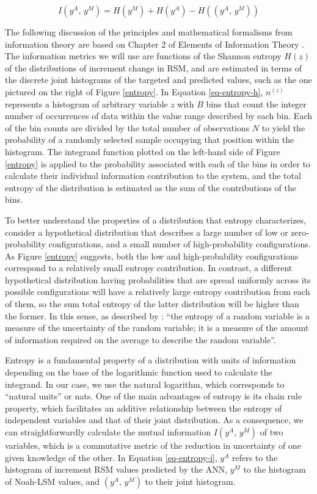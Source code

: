 \begin{equation}\label{eq-entropy-i}
    I(y^A,\,y^M) = H(y^M) + H(y^A) - H((y^A,\,y^M)) %
\end{equation}

The following discussion of the principles and mathematical formalisms from information theory are based on Chapter 2 of Elements of Information Theory \citep{schilling_entropy_2005}. The information metrics we will use are functions of the Shannon entropy $H(z)$ of the distributions of increment change in RSM, and are estimated in terms of the discrete joint histograms of the targeted and predicted values, such as the one pictured on the right of Figure \ref{entropy}. In Equation \ref{eq-entropy-h}, $n^{(z)}$ represents a histogram of arbitrary variable $z$ with $B$ bins that count the integer number of occurrences of data within the value range described by each bin. Each of the bin counts are divided by the total number of observations $N$ to yield the probability of a randomly selected sample occupying that position within the histogram. The integrand function plotted on the left-hand side of Figure \ref{entropy} is applied to the probability associated with each of the bins in order to calculate their individual information contribution to the system, and the total entropy of the distribution is estimated as the sum of the contributions of the bins.

To better understand the properties of a distribution that entropy characterizes, consider a hypothetical distribution that describes a large number of low or zero-probability configurations, and a small number of high-probability configurations. As Figure \ref{entropy} suggests, both the low and high-probability configurations correspond to a relatively small entropy contribution. In contrast, a different hypothetical distribution having probabilities that are spread uniformly across its possible configurations will have a relatively large entropy contribution from each of them, so the sum total entropy of the latter distribution will be higher than the former. In this sense, as described by \citep{schilling_entropy_2005}: ``the entropy of a random variable is a measure of the uncertainty of the random variable; it is a measure of the amount of information required on the average to describe the random variable''.

Entropy is a fundamental property of a distribution with units of information depending on the base of the logarithmic function used to calculate the integrand. In our case, we use the natural logarithm, which corresponds to ``natural units'' or nats. One of the main advantages of entropy is its chain rule property, which facilitates an additive relationship between the entropy of independent variables and that of their joint distribution. As a consequence, we can straightforwardly calculate the mutual information $I(y^A,\,y^M)$ of two variables, which is a commutative metric of the reduction in uncertainty of one given knowledge of the other. In Equation \ref{eq-entropy-i}, $y^A$ refers to the histogram of increment RSM values predicted by the ANN, $y^M$ to the histogram of Noah-LSM values, and $(y^A,\,y^M)$ to their joint histogram.

